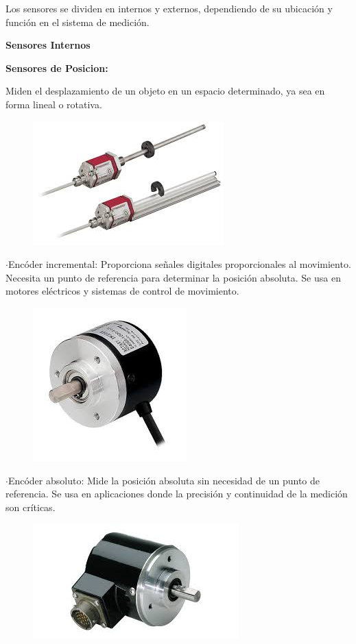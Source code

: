 Los sensores se dividen en internos y externos, dependiendo de su ubicación y función en el sistema de medición.


\textbf{Sensores Internos}


\textbf{Sensores de Posicion:}

	Miden el desplazamiento de un objeto en un espacio determinado, ya sea en forma lineal o rotativa.
	
	
\begin{figure} [h]
	\centering
	\includegraphics[width=0.3\linewidth]{img/sensorposicion}
	\caption{}
	\label{fig:sensorposicion}
\end{figure}
	
	$\cdot$Encóder incremental: Proporciona señales digitales proporcionales al movimiento. Necesita un punto de referencia para determinar la posición absoluta. Se usa en motores eléctricos y sistemas de control de movimiento.
	
	
	
\begin{figure} [h]
	\centering
	\includegraphics[width=0.3\linewidth]{img/encoderincremental}
	\caption{}
	\label{fig:encoderincremental}
\end{figure}


	$\cdot$Encóder absoluto: Mide la posición absoluta sin necesidad de un punto de referencia. Se usa en aplicaciones donde la precisión y continuidad de la medición son críticas.


\begin{figure} [h]
	\centering
	\includegraphics[width=0.3\linewidth]{img/encoderabsoluto}
	\caption{}
	\label{fig:encoderabsoluto}
\end{figure}



